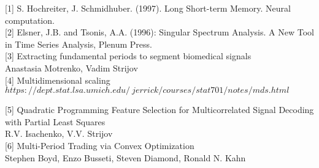 \documentclass{article}
\begin{document}



[1] S. Hochreiter, J. Schmidhuber. (1997). Long Short-term Memory. Neural computation.\\

[2] Elsner, J.B. and Tsonis, A.A. (1996): Singular Spectrum Analysis. A New Tool in Time Series Analysis, Plenum Press. \\

[3] Extracting fundamental periods to segment biomedical signals\\
Anastasia Motrenko, Vadim Strijov\\

[4] Multidimensional scaling\\
$https://dept.stat.lsa.umich.edu/~jerrick/courses/stat701/notes/mds.html$

[5] Quadratic Programming Feature Selection for Multicorrelated Signal Decoding with Partial Least Squares\\
R.V. Isachenko, V.V. Strijov\\

[6] Multi-Period Trading via Convex Optimization\\
Stephen Boyd, Enzo Busseti, Steven Diamond, Ronald N. Kahn
\end{document}
